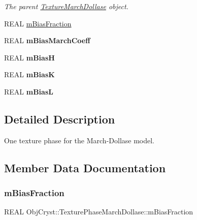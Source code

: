 \begin{DoxyCompactItemize}
\begin{DoxyCompactList}\small\item\em The parent \mbox{\hyperlink{class_obj_cryst_1_1_texture_march_dollase}{Texture\+March\+Dollase}} object. \end{DoxyCompactList}\item 
R\+E\+AL \mbox{\hyperlink{struct_obj_cryst_1_1_texture_phase_march_dollase_a0d17e8aa20d149c741c1afd95edf56da}{m\+Bias\+Fraction}}
\item 
\mbox{\label{struct_obj_cryst_1_1_texture_phase_march_dollase_a0dd475c57d0188d354bc25c5778b0172}} 
R\+E\+AL {\bfseries m\+Bias\+March\+Coeff}
\item 
\mbox{\label{struct_obj_cryst_1_1_texture_phase_march_dollase_adc4211e8726249e9a4ea1fecbdd3d00d}} 
R\+E\+AL {\bfseries m\+BiasH}
\item 
\mbox{\label{struct_obj_cryst_1_1_texture_phase_march_dollase_a55bf867c3441f8732c8d39f7f3c506cd}} 
R\+E\+AL {\bfseries m\+BiasK}
\item 
\mbox{\label{struct_obj_cryst_1_1_texture_phase_march_dollase_acccb771167b38f058b2b5f409023ee55}} 
R\+E\+AL {\bfseries m\+BiasL}
\end{DoxyCompactItemize}


\subsection{Detailed Description}
One texture phase for the March-\/\+Dollase model. 

\subsection{Member Data Documentation}
\mbox{\label{struct_obj_cryst_1_1_texture_phase_march_dollase_a0d17e8aa20d149c741c1afd95edf56da}} 
\subsubsection{\texorpdfstring{mBiasFraction}{mBiasFraction}}
{\footnotesize\ttfamily R\+E\+AL Obj\+Cryst\+::\+Texture\+Phase\+March\+Dollase\+::m\+Bias\+Fraction\hspace{0.3cm}{\ttfamily [mutable]}}

